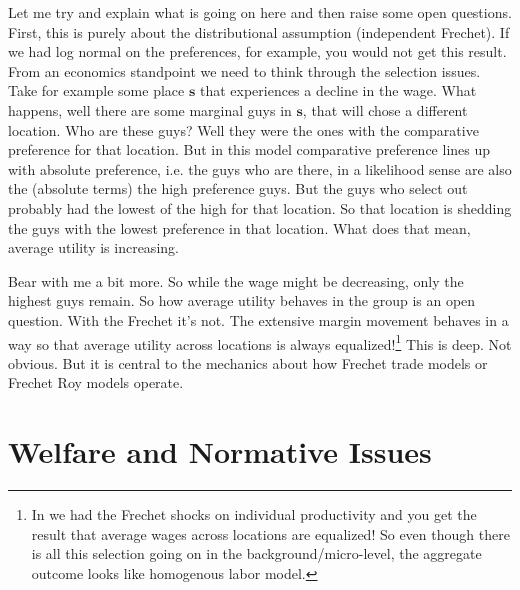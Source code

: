 \documentclass[pdftex,12pt]{article}
\begin{document}
\medskip
\noindent Let me try and explain what is going on here and then raise some open questions. First, this is purely about the distributional assumption (independent Frechet). If we had log normal on the preferences, for example, you would not get this result. From an economics standpoint we need to think through the selection issues. Take for example some place $\textbf{s}$ that experiences a decline in the wage. What happens, well there are some marginal guys in $\textbf{s}$, that will chose a different location. Who are these guys? Well they were the ones with the comparative preference for that location. But in this model comparative preference lines up with absolute preference, i.e. the guys who are there, in a likelihood sense are also the (absolute terms) the high preference guys. But the guys who select out probably had the lowest of the high for that location. So that location is shedding the guys with the lowest preference in that location. What does that mean, average utility is increasing. 

\medskip
\noindent Bear with me a bit more. So while the wage might be decreasing, only the highest guys remain. So how average utility behaves in the group is an open question. With the Frechet it's not. The extensive margin movement behaves in a way so that average utility across locations is always equalized!\footnote{In \citet{lagakos2013selection} we had the Frechet shocks on individual productivity and you get the result that average wages across locations are equalized! So even though there is all this selection going on in the background/micro-level, the aggregate outcome looks like homogenous labor model.} This is deep. Not obvious. But it is central to the mechanics about how Frechet trade models or Frechet Roy models operate.


\newpage

\section{Welfare and Normative Issues}





\newpage

\small

\end{document}

